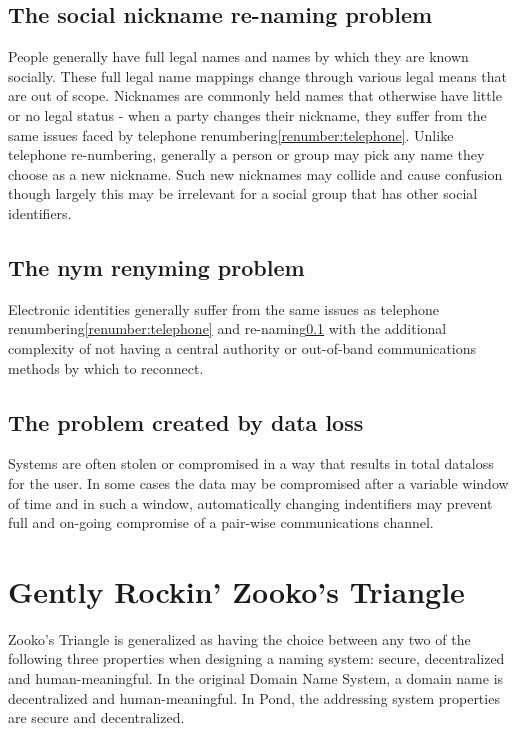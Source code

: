 \documentclass[letterpaper,twocolumn,10pt]{article}
\begin{document}
\subsection{The social nickname re-naming problem}
\label{rename:social-nickname}

People generally have full legal names and names by which they are known
socially. These full legal name mappings change through various legal means
that are out of scope. Nicknames are commonly held names that otherwise have
little or no legal status - when a party changes their nickname, they suffer
from the same issues faced by telephone renumbering\ref{renumber:telephone}.
Unlike telephone re-numbering, generally a person or group may pick any name
they choose as a new nickname. Such new nicknames may collide and cause
confusion though largely this may be irrelevant for a social group that has
other social identifiers.

\subsection{The nym renyming problem}

Electronic identities generally suffer from the same issues as telephone
renumbering\ref{renumber:telephone} and re-naming\ref{rename:social-nickname}
with the additional complexity of not having a central authority or out-of-band
communications methods by which to reconnect.

\subsection{The problem created by data loss}
\label{sec:problem}

Systems are often stolen or compromised in a way that results in total
dataloss for the user. In some cases the data may be compromised after a
variable window of time and in such a window, automatically changing
indentifiers may prevent full and on-going compromise of a pair-wise
communications channel.

\section{Gently Rockin' Zooko's Triangle}
\label{sec:zooko}

Zooko's Triangle\cite{zookostriangle} is generalized as having the choice
between any two of the following three properties when designing a naming
system: secure, decentralized and human-meaningful. In the original Domain Name
System, a domain name is decentralized and human-meaningful. In
Pond\cite{pond}, the addressing system properties are secure and decentralized.
\end{document}
